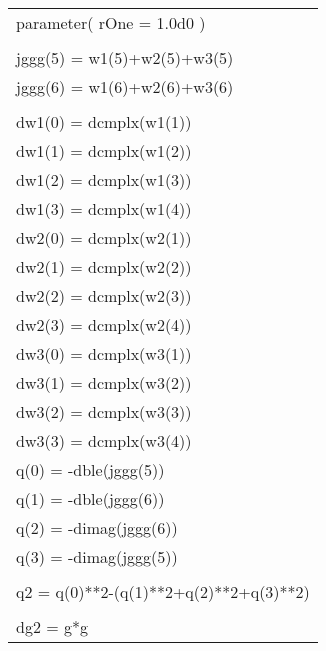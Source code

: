 \begin{center}
{\begin{supertabular}{l}
      \hspace{0.5em} parameter( rOne = 1.0d0 )\\
\\
      \hspace{0.5em} jggg(5) = w1(5)+w2(5)+w3(5)\\
      \hspace{0.5em} jggg(6) = w1(6)+w2(6)+w3(6)\\
\\
      \hspace{0.5em} dw1(0) = dcmplx(w1(1))\\
      \hspace{0.5em} dw1(1) = dcmplx(w1(2))\\
      \hspace{0.5em} dw1(2) = dcmplx(w1(3))\\
      \hspace{0.5em} dw1(3) = dcmplx(w1(4))\\
      \hspace{0.5em} dw2(0) = dcmplx(w2(1))\\
      \hspace{0.5em} dw2(1) = dcmplx(w2(2))\\
      \hspace{0.5em} dw2(2) = dcmplx(w2(3))\\
      \hspace{0.5em} dw2(3) = dcmplx(w2(4))\\
      \hspace{0.5em} dw3(0) = dcmplx(w3(1))\\
      \hspace{0.5em} dw3(1) = dcmplx(w3(2))\\
      \hspace{0.5em} dw3(2) = dcmplx(w3(3))\\
      \hspace{0.5em} dw3(3) = dcmplx(w3(4))\\
      \hspace{0.5em} q(0) = -dble(jggg(5))\\
      \hspace{0.5em} q(1) = -dble(jggg(6))\\
      \hspace{0.5em} q(2) = -dimag(jggg(6))\\
      \hspace{0.5em} q(3) = -dimag(jggg(5))\\
\\
      \hspace{0.5em} q2 = q(0)**2-(q(1)**2+q(2)**2+q(3)**2)\\
\\
      \hspace{0.5em} dg2 = g*g\\


\end{supertabular}}
\end{center}
